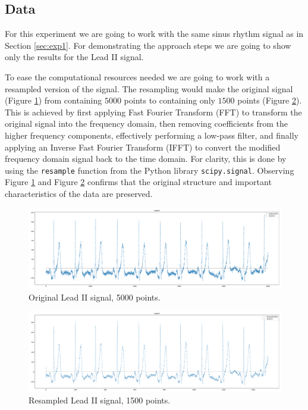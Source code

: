 \documentclass{mldsmsc}
\begin{document}
\subsection{Data}

\noindent For this experiment we are going to work with the same sinus rhythm signal as in Section \ref{sec:exp1}. For demonstrating the approach steps we are going to show only the results for the Lead II signal. \newline

\noindent To ease the computational resources needed we are going to work with a resampled version of the signal. The resampling would make the original signal (Figure \ref{fig:orig-ecg}) from containing $5000$ points to containing only $1500$ points (Figure \ref{fig:resampled-ecg}). This is achieved by first applying Fast Fourier Transform (FFT) to transform the original signal into the frequency domain, then removing coefficients from the higher frequency components, effectively performing a low-pass filter, and finally applying an Inverse Fast Fourier Transform (IFFT) to convert the modified frequency domain signal back to the time domain. For clarity, this is done by using the \texttt{resample} function from the Python library \texttt{scipy.signal}. Observing Figure \ref{fig:orig-ecg} and Figure \ref{fig:resampled-ecg} confirms that the original structure and important characteristics of the data are preserved. \newline

\begin{figure}[H]
\centering
\includegraphics[width=1\linewidth]{images/r_peaks/original_ecg_m.pdf}
\caption{Original Lead II signal, 5000 points.}
\label{fig:orig-ecg}
\end{figure}

\begin{figure}[H]
\centering
\includegraphics[width=1\linewidth]{images/r_peaks/resampled_ecg_m.pdf}
\caption{Resampled Lead II signal, 1500 points.}
\label{fig:resampled-ecg}
\end{figure}
\end{document}
